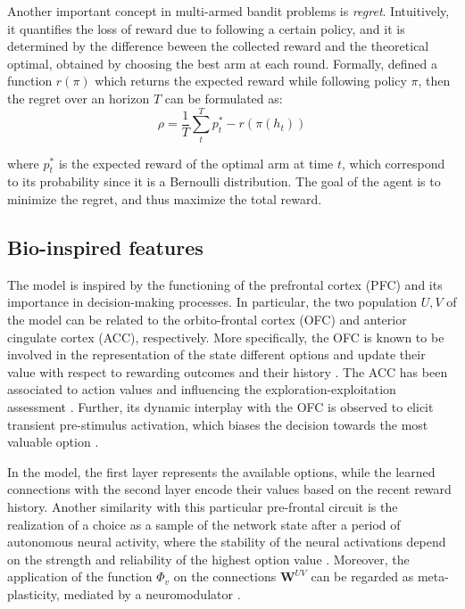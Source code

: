 Another important concept in multi-armed bandit problems is \textit{regret}. Intuitively, it quantifies the loss of reward due to following a certain policy, and it is determined by the difference beween the collected reward and the theoretical optimal, obtained by choosing the best arm at each round.
Formally, defined a function $r(\pi)$ which returns the expected reward while following policy $\pi$, then the regret over an horizon $T$ can be formulated as:
\begin{equation}
    \rho = \frac{1}{T}\sum^{T}_{t} p^{*}_{t} -r(\pi(h_{t}))
\end{equation}

\noindent where $p^{*}_{t}$ is the expected reward of the optimal arm at time $t$, which correspond to its probability since it is a Bernoulli distribution.
\noindent The goal of the agent is to minimize the regret, and thus maximize the total reward.





\subsection{Bio-inspired features}

The model is inspired by the functioning of the prefrontal cortex (PFC) and its importance in decision-making processes. In particular, the two population $U, V$ of the model can be related to the orbito-frontal cortex (OFC) and anterior cingulate cortex (ACC), respectively.
More specifically, the OFC is known to be involved in the representation of the state different options and update their value with respect to rewarding outcomes and their history \cite{lukChoiceCodingFrontal2013, kennerleyDecisionMakingReward2011a}.
The ACC has been associated to action values and influencing the exploration-exploitation assessment \cite{khamassiChapter22Medial2013}. Further, its dynamic interplay with the OFC is observed to elicit transient pre-stimulus activation, which biases the decision towards the most valuable option \cite{funahashiPrefrontalContributionDecisionMaking2017, marcosDeterminingMonkeyFree2016, balewskiValueDynamicsAffect2023}.

In the model, the first layer represents the available options, while the learned connections with the second layer encode their values based on the recent reward history.
Another similarity with this particular pre-frontal circuit is the realization of a choice as a sample of the network state after a period of autonomous neural activity, where the stability of the neural activations depend on the strength and reliability of the highest option value \cite{backmanEffectsWorkingMemoryTraining2011, enelStableDynamicRepresentations2020}.
Moreover, the application of the function $\Phi_{v}$ on the connections $\textbf{W}^{UV}$ can be regarded as meta-plasticity, mediated by a neuromodulator \cite{wangMetalearningNaturalArtificial2021}.


